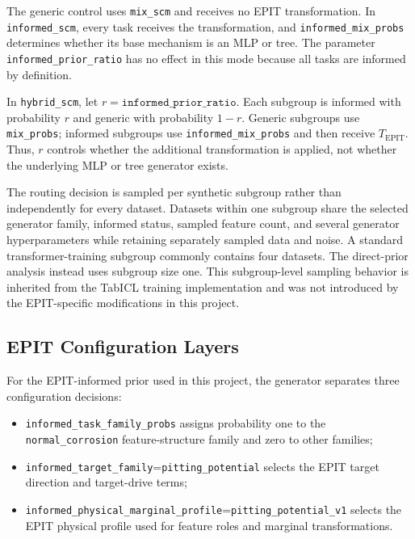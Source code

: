 \documentclass{article}
\begin{document}
The generic control uses \texttt{mix\_scm} and receives no EPIT transformation. In \texttt{informed\_scm}, every task receives the transformation, and \texttt{informed\_mix\_probs} determines whether its base mechanism is an MLP or tree. The parameter \texttt{informed\_prior\_ratio} has no effect in this mode because all tasks are informed by definition.

In \texttt{hybrid\_scm}, let \(r=\texttt{informed\_prior\_ratio}\). Each subgroup is informed with probability \(r\) and generic with probability \(1-r\). Generic subgroups use \texttt{mix\_probs}; informed subgroups use \texttt{informed\_mix\_probs} and then receive \(T_{\mathrm{EPIT}}\). Thus, \(r\) controls whether the additional transformation is applied, not whether the underlying MLP or tree generator exists.

The routing decision is sampled per synthetic subgroup rather than independently for every dataset. Datasets within one subgroup share the selected generator family, informed status, sampled feature count, and several generator hyperparameters while retaining separately sampled data and noise. A standard transformer-training subgroup commonly contains four datasets. The direct-prior analysis instead uses subgroup size one.
This subgroup-level sampling behavior is inherited from the TabICL training
implementation and was not introduced by the EPIT-specific modifications in this
project. 

\subsection{EPIT Configuration Layers}

For the EPIT-informed prior used in this project, the generator separates three
configuration decisions:

\begin{itemize}
    \item \texttt{informed\_task\_family\_probs} assigns probability one to the
    \texttt{normal\_corrosion} feature-structure family and zero to other families;
    \item \texttt{informed\_target\_family}=\texttt{pitting\_potential} selects the
    EPIT target direction and target-drive terms;
    \item \texttt{informed\_physical\_marginal\_profile}=\texttt{pitting\_potential\_v1}
    selects the EPIT physical profile used for feature roles and marginal
    transformations.
\end{itemize}
\end{document}
